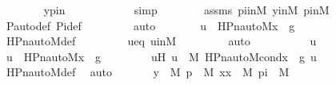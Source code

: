 \begin{isabellebody}
\ \ \ \ \ \ \isamarkupfalse%
\ ypin\isanewline
\ \ \ \ \ \ \ \ \ \ \isamarkupfalse%
\ simp\isanewline
\ \ \ \ \ \ \isamarkupfalse%
\ assms{}\ piinM\ yinM\ pinM\isanewline
\ \ \ \ \ \ \isamarkupfalse%
\ P{\isacharunderscore}{\kern0pt}auto{\isacharunderscore}{\kern0pt}def\ Pi{\isacharunderscore}{\kern0pt}def\ \isanewline
\ \ \ \ \ \ \isamarkupfalse%
\ auto\isanewline
\isanewline
\ \ \ \ \isamarkupfalse%
\ \isamarkupfalse%
\ {\isachardoublequoteopen}u\ {\isasymin}\ HPn{\isacharunderscore}{\kern0pt}auto{\isacharunderscore}{\kern0pt}M{\isacharparenleft}{\kern0pt}{\isacharless}{\kern0pt}x{\isacharcomma}{\kern0pt}\ {\isasympi}{\isachargreater}{\kern0pt}{\isacharcomma}{\kern0pt}\ g{\isacharparenright}{\kern0pt}{\isachardoublequoteclose}\isanewline
\ \ \ \ \ \ \isamarkupfalse%
\ HPn{\isacharunderscore}{\kern0pt}auto{\isacharunderscore}{\kern0pt}M{\isacharunderscore}{\kern0pt}def\ \isanewline
\ \ \ \ \ \ \isamarkupfalse%
\ ueq\ uinM\ \isanewline
\ \ \ \ \ \ \isamarkupfalse%
\ auto\isanewline
\ \ \isamarkupfalse%
\ \isanewline
\ \ \ \ \isamarkupfalse%
\ u\ \isamarkupfalse%
\ {\isachardoublequoteopen}u\ {\isasymin}\ HPn{\isacharunderscore}{\kern0pt}auto{\isacharunderscore}{\kern0pt}M{\isacharparenleft}{\kern0pt}{\isasymlangle}x{\isacharcomma}{\kern0pt}\ {\isasympi}{\isasymrangle}{\isacharcomma}{\kern0pt}\ g{\isacharparenright}{\kern0pt}{\isachardoublequoteclose}\ \isanewline
\ \ \ \ \isamarkupfalse%
\ \isamarkupfalse%
\ uH{\isacharcolon}{\kern0pt}\ {\isachardoublequoteopen}u\ {\isasymin}\ M{\isachardoublequoteclose}\ {\isachardoublequoteopen}HPn{\isacharunderscore}{\kern0pt}auto{\isacharunderscore}{\kern0pt}M{\isacharunderscore}{\kern0pt}cond{\isacharparenleft}{\kern0pt}{\isacharless}{\kern0pt}x{\isacharcomma}{\kern0pt}\ {\isasympi}{\isachargreater}{\kern0pt}{\isacharcomma}{\kern0pt}\ g{\isacharcomma}{\kern0pt}\ u{\isacharparenright}{\kern0pt}{\isachardoublequoteclose}\ \isamarkupfalse%
\ HPn{\isacharunderscore}{\kern0pt}auto{\isacharunderscore}{\kern0pt}M{\isacharunderscore}{\kern0pt}def\ \isamarkupfalse%
\ auto\ \isanewline
\ \ \ \ \isamarkupfalse%
\ {\isachardoublequoteopen}{\isacharparenleft}{\kern0pt}{\isasymexists}y\ {\isasymin}\ M{\isachardot}{\kern0pt}\ {\isasymexists}p\ {\isasymin}\ M{\isachardot}{\kern0pt}\ {\isasymexists}xx\ {\isasymin}\ M{\isachardot}{\kern0pt}\ {\isasymexists}pi\ {\isasymin}\ M{\isachardot}{\kern0pt}\ \isanewline

\end{isabellebody}
